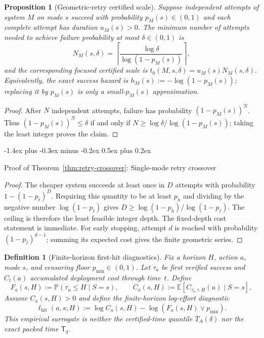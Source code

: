 \documentclass[10pt,twocolumn]{article}
\makeatletter
\theoremstyle{paperplain}
\newtheorem{proposition}[theorem]{Proposition}
\theoremstyle{paperdefinition}
\newtheorem{definition}[theorem]{Definition}
\theoremstyle{paperremark}
\renewcommand{\subsection}{%
  \@startsection{subsection}{2}{\z@}%
    {-1.4ex plus -0.3ex minus -0.2ex}%
    {0.5ex plus 0.2ex}%
    {\normalfont\normalsize\bfseries\raggedright}}
\newcommand{\E}{\mathbb{E}}
\newcommand{\Prb}{\mathbb{P}}
\makeatother
\begin{document}
\begin{proposition}[Geometric-retry certified scale]
\label{prop:geometric-certified-scale}
Suppose independent attempts of system $M$ on mode $s$ succeed with probability $p_M(s)\in(0,1)$ and each complete attempt has duration $u_M(s)>0$.
The minimum number of attempts needed to achieve failure probability at most $\delta\in(0,1)$ is
\[
N_M(s,\delta)
=
\left\lceil\frac{\log\delta}{\log(1-p_M(s))}\right\rceil,
\]
and the corresponding focused certified scale is $t_0(M,s,\delta)=u_M(s)N_M(s,\delta)$.
Equivalently, the exact success hazard is $h_M(s):=-\log(1-p_M(s))$; replacing it by $p_M(s)$ is only a small-$p_M(s)$ approximation.
\end{proposition}

\begin{proof}
After $N$ independent attempts, failure has probability $(1-p_M(s))^N$.
Thus $(1-p_M(s))^N\le\delta$ if and only if
$N\ge\log\delta/\log(1-p_M(s))$; taking the least integer proves the claim.
\end{proof}

\subsection{Proof of Theorem~\ref{thm:retry-crossover}: Single-mode retry crossover}
\label{app:proof:retry-crossover}

\begin{proof}
The cheaper system succeeds at least once in $D$ attempts with probability
$1-(1-p_\ell)^D$.
Requiring this quantity to be at least $p_h$ and dividing by the negative number
$\log(1-p_\ell)$ gives
$D\ge\log(1-p_h)/\log(1-p_\ell)$.
The ceiling is therefore the least feasible integer depth.
The fixed-depth cost statement is immediate.
For early stopping, attempt $d$ is reached with probability $(1-p_\ell)^{d-1}$; summing its expected cost gives the finite geometric series.
\end{proof}

\begin{definition}[Finite-horizon first-hit diagnostics]
\label{def:first-hit-diagnostics}
Fix a horizon $H$, action $a$, mode $s$, and censoring floor $p_{\min}\in(0,1)$.
Let $\tau_a$ be first verified success and $C_t(a)$ accumulated deployment cost through time~$t$.
Define
\[
F_a(s,H):=\Prb(\tau_a\le H\mid S=s),
\qquad
C_a(s,H):=\E[C_{\tau_a\wedge H}(a)\mid S=s],
\]
Assume $C_a(s,H)>0$ and define the finite-horizon log-effort diagnostic
\[
\ell_{\mathrm{hit}}(a,s;H)
:=
\log C_a(s,H)-\log(F_a(s,H)\vee p_{\min}).
\]
This empirical surrogate is neither the certified-time quantile $\overline T_A(\delta)$ nor the exact packed time $\mathsf T_q$.
\end{definition}
\end{document}
